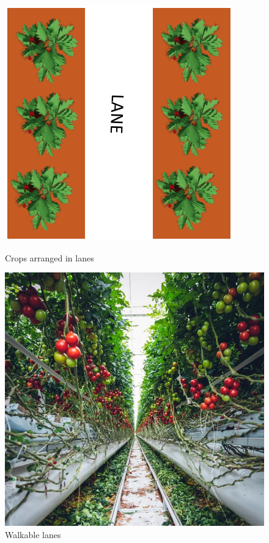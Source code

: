 \begin{figure}[H]
    \centering
    \begin{minipage}[b]{0.47\textwidth}
        \includegraphics[width=\textwidth]{user-view/lanes.png}
        \caption{Crops arranged in lanes}
    \end{minipage}
    \hfill
    \begin{minipage}[b]{0.49\textwidth}
        \includegraphics[width=\textwidth]{user-view/plant1_markus_spiske_unsplash.jpg}
        \caption{Walkable lanes}
    \end{minipage}
\end{figure}


